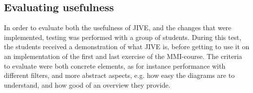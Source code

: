 \subsection{Evaluating usefulness}\label{jiveEval}
In order to evaluate both the usefulness of JIVE, and the changes that were implemented, testing was performed with a group of students.
During this test, the students received a demonstration of what JIVE is, before getting to use it on an implementation of the first and last exercise of the MMI-course.
The criteria to evaluate were both concrete elements, as for instance performance with different filters, and more abstract aspects, e.g. how easy the diagrams are to understand, and how good of an overview they provide.